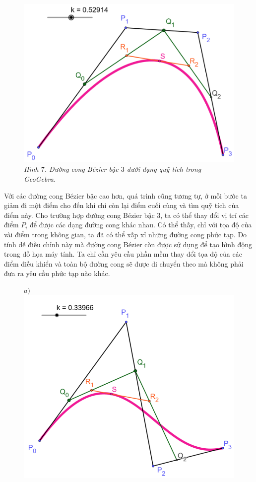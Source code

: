 \begin{multicols}{2}
\begin{figure}[H]
		\includegraphics[width= 0.8\linewidth]{11}
		\caption{\small\textit{\color{toanhocdoisong}Hình $7$. Đường cong Bézier bậc $3$ dưới dạng quỹ tích trong GeoGebra.}}
		\vspace*{-10pt}
	\end{figure}
	Với các đường cong Bézier bậc cao hơn, quá trình cũng tương tự, ở mỗi bước ta giảm đi một điểm cho đến khi chi còn lại điểm cuối cùng và tìm quỹ tích của điểm này.
	\vskip 0.1cm
	Cho trường hợp đường cong Bézier bậc $3$, ta có thể thay đổi vị trí các điểm $P_i$ để được các dạng đường cong khác nhau. Có thể thấy, chỉ với tọa độ của vài điểm trong không gian, ta đã có thể xấp xỉ những đường cong phức tạp. Do tính dễ điều chỉnh này mà đường cong Bézier còn được sử dụng để tạo hình động trong đồ họa máy tính. Ta chỉ cần yêu cầu phần mềm thay đổi tọa độ của các điểm điều khiển và toàn bộ đường cong sẽ được di chuyển theo mà không phải đưa ra yêu cầu phức tạp nào khác.
	\begin{figure}[H]
		\vspace*{-5pt}
		\centering
		\captionsetup{labelformat= empty, justification=centering}
		$a)$\includegraphics[width= 0.83\linewidth]{12}

\end{figure}
\end{multicols}
